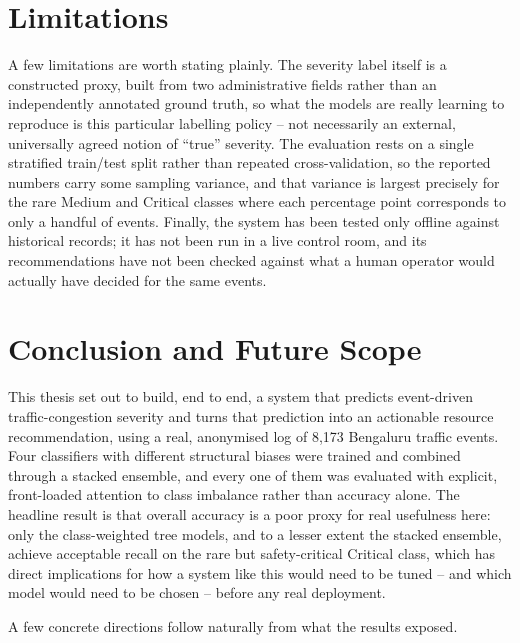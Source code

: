 \section{Limitations}

A few limitations are worth stating plainly. The severity label itself is a constructed proxy, built from two administrative fields rather than an independently annotated ground truth, so what the models are really learning to reproduce is this particular labelling policy -- not necessarily an external, universally agreed notion of ``true'' severity. The evaluation rests on a single stratified train/test split rather than repeated cross-validation, so the reported numbers carry some sampling variance, and that variance is largest precisely for the rare Medium and Critical classes where each percentage point corresponds to only a handful of events. Finally, the system has been tested only offline against historical records; it has not been run in a live control room, and its recommendations have not been checked against what a human operator would actually have decided for the same events.

\section{Conclusion and Future Scope}
\label{sec:future-scope}

This thesis set out to build, end to end, a system that predicts event-driven traffic-congestion severity and turns that prediction into an actionable resource recommendation, using a real, anonymised log of 8{,}173 Bengaluru traffic events. Four classifiers with different structural biases were trained and combined through a stacked ensemble, and every one of them was evaluated with explicit, front-loaded attention to class imbalance rather than accuracy alone. The headline result is that overall accuracy is a poor proxy for real usefulness here: only the class-weighted tree models, and to a lesser extent the stacked ensemble, achieve acceptable recall on the rare but safety-critical Critical class, which has direct implications for how a system like this would need to be tuned -- and which model would need to be chosen -- before any real deployment.

A few concrete directions follow naturally from what the results exposed.


